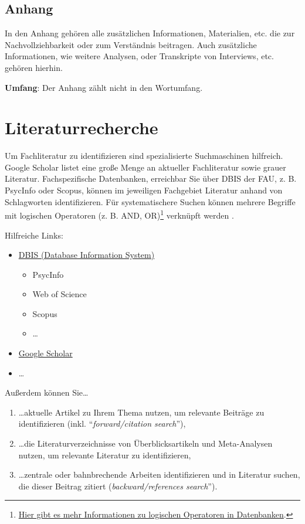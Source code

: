 \documentclass[
  letterpaper,
  DIV=11]{scrreprt}
\providecommand{\tightlist}{%
  \setlength{\itemsep}{0pt}\setlength{\parskip}{0pt}}\usepackage{longtable,booktabs,array}
\begin{document}
\hypertarget{anhang}{%
\section{Anhang}\label{anhang}}

In den Anhang gehören alle zusätzlichen Informationen, Materialien, etc.
die zur Nachvollziehbarkeit oder zum Verständnis beitragen. Auch
zusätzliche Informationen, wie weitere Analysen, oder Transkripte von
Interviews, etc. gehören hierhin.

\textbf{Umfang}: Der Anhang zählt nicht in den Wortumfang.

\hypertarget{literaturrecherche}{%
\chapter{Literaturrecherche}\label{literaturrecherche}}

Um Fachliteratur zu identifizieren sind spezialisierte Suchmaschinen
hilfreich. Google Scholar listet eine große Menge an aktueller
Fachliteratur sowie grauer Literatur. Fachspezifische Datenbanken,
erreichbar Sie über DBIS der FAU, z. B. PsycInfo oder Scopus, können im
jeweiligen Fachgebiet Literatur anhand von Schlagworten identifizieren.
Für systematischere Suchen können mehrere Begriffe mit logischen
Operatoren (z. B. AND, OR)\footnote{\href{https://libguides.mit.edu/c.php?g=175963\&p=1158594}{Hier
  gibt es mehr Informationen zu logischen Operatoren in Datenbanken}.}
verknüpft werden .

Hilfreiche Links:

\begin{itemize}
\item
  \href{https://ub.fau.de/recherchieren/datenbanken/}{DBIS (Database
  Information System)}

  \begin{itemize}
  \item
    PsycInfo
  \item
    Web of Science
  \item
    Scopus
  \item
    \ldots{}
  \end{itemize}
\item
  \href{https://scholar.google.com/}{Google Scholar}
\item
  \ldots{}
\end{itemize}

Außerdem können Sie\ldots{}

\begin{enumerate}
\def\labelenumi{\arabic{enumi}.}
\tightlist
\item
  \ldots aktuelle Artikel zu Ihrem Thema nutzen, um relevante Beiträge
  zu identifizieren (inkl. ``\emph{forward/citation search}''),
\item
  \ldots die Literaturverzeichnisse von Überblicksartikeln und
  Meta-Analysen nutzen, um relevante Literatur zu identifizieren,
\item
  \ldots zentrale oder bahnbrechende Arbeiten identifizieren und in
  Literatur suchen, die dieser Beitrag zitiert
  (\emph{backward/references search}'').
\end{enumerate}
\end{document}
